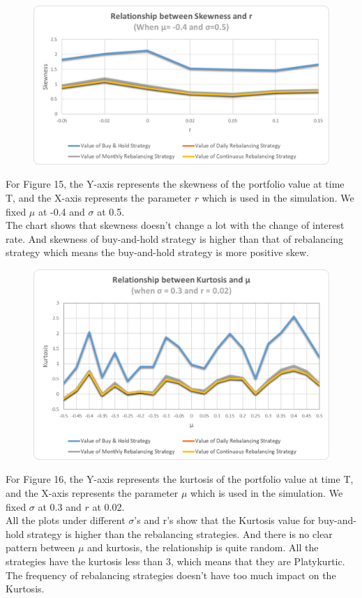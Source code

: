 \documentclass[
10pt, %
a4paper, %
oneside, %
headinclude,footinclude, %
BCOR5mm, %
]{scrartcl}
\begin{document}
\begin{figure}[H]
	\centering
	\includegraphics[width=0.7\linewidth]{skew_r_-040_050}
	\caption{}
	\label{fig:skewr-040050}
\end{figure}
For Figure 15, the Y-axis represents the skewness of the portfolio value at time T, and the X-axis represents the parameter $r$ which is used in the simulation. We fixed $\mu$ at -0.4 and $\sigma$ at 0.5.\\

The chart shows that skewness doesn’t change a lot with the change of interest rate. And skewness of buy-and-hold strategy is higher than that of rebalancing strategy which means the buy-and-hold strategy is more positive skew. \\

\begin{figure}[H]
	\centering
	\includegraphics[width=0.7\linewidth]{Kurto_mu_030_002}
	\caption{}
	\label{fig:kurtomu030002}
\end{figure}
For Figure 16, the Y-axis represents the kurtosis of the portfolio value at time T, and the X-axis represents the parameter $\mu$ which is used in the simulation. We fixed $\sigma$ at 0.3 and $r$ at 0.02.\\

All the plots under different $\sigma$’s and r’s show that the Kurtosis value for buy-and-hold strategy is higher than the rebalancing strategies. And there is no clear pattern between $\mu$ and kurtosis, the relationship is quite random. All the strategies have the kurtosis less than 3, which means that they are Platykurtic. The frequency of rebalancing strategies doesn’t have too much impact on the Kurtosis. \\
\end{document}
